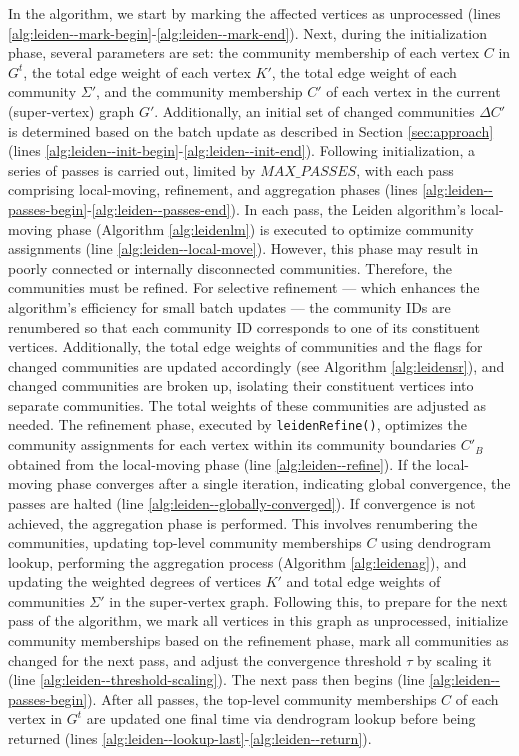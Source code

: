 In the algorithm, we start by marking the affected vertices as unprocessed (lines \ref{alg:leiden--mark-begin}-\ref{alg:leiden--mark-end}). Next, during the initialization phase, several parameters are set: the community membership of each vertex $C$ in $G^t$, the total edge weight of each vertex $K'$, the total edge weight of each community $\Sigma'$, and the community membership $C'$ of each vertex in the current (super-vertex) graph $G'$. Additionally, an initial set of changed communities $\Delta C'$ is determined based on the batch update as described in Section \ref{sec:approach} (lines \ref{alg:leiden--init-begin}-\ref{alg:leiden--init-end}). Following initialization, a series of passes is carried out, limited by $MAX\_PASSES$, with each pass comprising local-moving, refinement, and aggregation phases (lines \ref{alg:leiden--passes-begin}-\ref{alg:leiden--passes-end}). In each pass, the Leiden algorithm’s local-moving phase (Algorithm \ref{alg:leidenlm}) is executed to optimize community assignments (line \ref{alg:leiden--local-move}). However, this phase may result in poorly connected or internally disconnected communities. Therefore, the communities must be refined. For selective refinement --- which enhances the algorithm's efficiency for small batch updates --- the community IDs are renumbered so that each community ID corresponds to one of its constituent vertices. Additionally, the total edge weights of communities and the flags for changed communities are updated accordingly (see Algorithm \ref{alg:leidensr}), and changed communities are broken up, isolating their constituent vertices into separate communities. The total weights of these communities are adjusted as needed. The refinement phase, executed by \texttt{leidenRefine()}, optimizes the community assignments for each vertex within its community boundaries $C'_B$ obtained from the local-moving phase (line \ref{alg:leiden--refine}). If the local-moving phase converges after a single iteration, indicating global convergence, the passes are halted (line \ref{alg:leiden--globally-converged}). If convergence is not achieved, the aggregation phase is performed. This involves renumbering the communities, updating top-level community memberships $C$ using dendrogram lookup, performing the aggregation process (Algorithm \ref{alg:leidenag}), and updating the weighted degrees of vertices $K'$ and total edge weights of communities $\Sigma'$ in the super-vertex graph. Following this, to prepare for the next pass of the algorithm, we mark all vertices in this graph as unprocessed, initialize community memberships based on the refinement phase, mark all communities as changed for the next pass, and adjust the convergence threshold $\tau$ by scaling it (line \ref{alg:leiden--threshold-scaling}). The next pass then begins (line \ref{alg:leiden--passes-begin}). After all passes, the top-level community memberships $C$ of each vertex in $G^t$ are updated one final time via dendrogram lookup before being returned (lines \ref{alg:leiden--lookup-last}-\ref{alg:leiden--return}).

